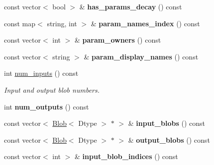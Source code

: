 \begin{DoxyCompactItemize}
const vector$<$ bool $>$ \& {\bfseries has\+\_\+params\+\_\+decay} () const
\item 
\mbox{\label{classcaffe_1_1_net_a4bc40bc25f238f2c8f63d806762672ba}} 
const map$<$ string, int $>$ \& {\bfseries param\+\_\+names\+\_\+index} () const
\item 
\mbox{\label{classcaffe_1_1_net_aae4c9fb34c016449eb77537efba6033b}} 
const vector$<$ int $>$ \& {\bfseries param\+\_\+owners} () const
\item 
\mbox{\label{classcaffe_1_1_net_a80126ec711a7eb61dcb45dd93aaf3da4}} 
const vector$<$ string $>$ \& {\bfseries param\+\_\+display\+\_\+names} () const
\item 
\mbox{\label{classcaffe_1_1_net_a6b04ab79ff08386d5a6fd167fd7696a3}} 
int \mbox{\hyperlink{classcaffe_1_1_net_a6b04ab79ff08386d5a6fd167fd7696a3}{num\+\_\+inputs}} () const
\begin{DoxyCompactList}\small\item\em Input and output blob numbers. \end{DoxyCompactList}\item 
\mbox{\label{classcaffe_1_1_net_a335522f32062225c472382dbb5aff176}} 
int {\bfseries num\+\_\+outputs} () const
\item 
\mbox{\label{classcaffe_1_1_net_a986652086c495810e1558208e60fd3a6}} 
const vector$<$ \mbox{\hyperlink{classcaffe_1_1_blob}{Blob}}$<$ Dtype $>$ $\ast$ $>$ \& {\bfseries input\+\_\+blobs} () const
\item 
\mbox{\label{classcaffe_1_1_net_a1ca04c0622bab2857e30c3e07ef85d9c}} 
const vector$<$ \mbox{\hyperlink{classcaffe_1_1_blob}{Blob}}$<$ Dtype $>$ $\ast$ $>$ \& {\bfseries output\+\_\+blobs} () const
\item 
\mbox{\label{classcaffe_1_1_net_a904ff62c3013aa9e2a02687c7d01871a}} 
const vector$<$ int $>$ \& {\bfseries input\+\_\+blob\+\_\+indices} () const
\item 
\mbox{\label{classcaffe_1_1_net_a7358f4e7ee8c689d83be22d31213fad8}} 

\end{DoxyCompactItemize}
